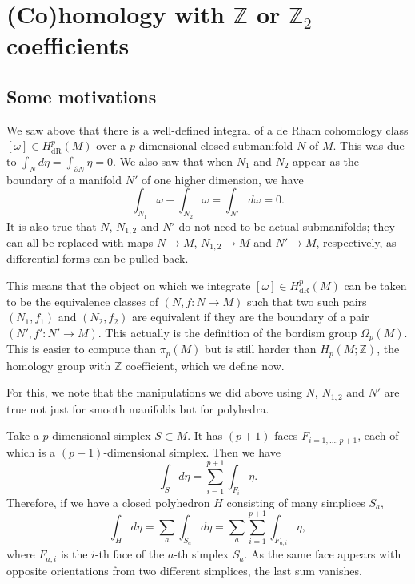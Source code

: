 \documentclass[12pt]{article}
\numberwithin{equation}{section}
\numberwithin{figure}{section}
\theoremstyle{remark}
\def\bZ{\mathbb{Z}}
\begin{document}
\section{(Co)homology with $\bZ$ or $\bZ_2$ coefficients}

\subsection{Some motivations}
We saw above that there is a well-defined integral of a de Rham cohomology class $[\omega]\in H^p_\text{dR}(M)$ 
over a $p$-dimensional closed submanifold $N$ of $M$.
This was due to $\int_N d\eta=\int_{\partial N}\eta=0$.
We also saw that when $N_1$ and $N_2$ appear as the boundary of a manifold $N'$ of one higher dimension, we have \begin{equation}
\int_{N_1} \omega - \int_{N_2} \omega = \int_{N'} d\omega = 0.
\end{equation}
It is also true that $N$, $N_{1,2}$ and $N'$ do not need to be actual submanifolds;
they can all be replaced with maps $N\to M$, $N_{1,2}\to M$ and $N'\to M$, respectively,
as differential forms can be pulled back.

This means that the object on which we integrate $[\omega]\in H^p_\text{dR}(M)$ 
can be taken to be the equivalence classes of $(N, f:N\to M)$
such that two such pairs $(N_1,f_1)$ and $(N_2,f_2)$ are equivalent if they are the boundary of a pair $(N',f':N'\to M)$.
This actually is the definition of the bordism group $\Omega_p(M)$.
This is easier to compute than $\pi_p(M)$ but is still harder than $H_p(M;\bZ)$, the homology group with $\bZ$ coefficient, which we define now.

For this, we note that the manipulations we did above using $N$, $N_{1,2}$ and $N'$ 
are true not just for smooth manifolds but for polyhedra.

Take a $p$-dimensional simplex $S \subset M$.
It has $(p+1)$ faces $F_{i=1,\ldots,p+1}$, each of which is a $(p-1)$-dimensional simplex.
Then we have \begin{equation}
\int_S d\eta = \sum_{i=1}^{p+1}  \int_{F_i} \eta.
\end{equation}
Therefore, if we have a closed polyhedron $H$ consisting of many simplices $S_a$, \begin{equation}
\int_H d\eta = \sum_a \int_{S_a} d\eta = \sum_a \sum_{i=1}^{p+1}  \int_{F_{a,i}} \eta,
\end{equation}
where $F_{a,i}$ is the $i$-th face of the $a$-th simplex $S_a$.
As the same face appears with opposite orientations from two different simplices, the last sum vanishes. 
\end{document}
